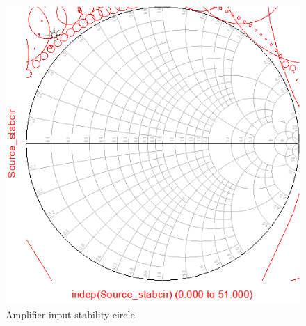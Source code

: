   \begin{figure}[H]
	  \begin{minipage}[b]{.45\textwidth}
	  \centering
	  \includegraphics[width=\linewidth]{img/Stabilization_source_circle}
  	  \caption{Amplifier input stability circle}
	  \label{fig:Stabcircle_in}
  \end{minipage}%
  \begin{minipage}{.1\textwidth}
	  \hspace{\linewidth}
  \end{minipage}%
  \begin{minipage}[b]{.45\textwidth}
	  \centering

\end{minipage}
\end{figure}
